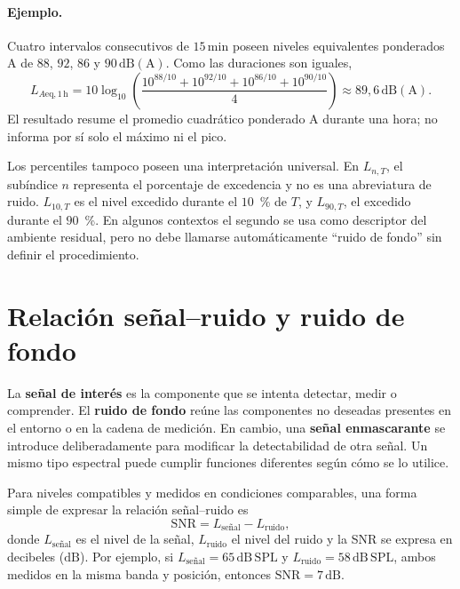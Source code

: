 \paragraph{Ejemplo.}
Cuatro intervalos consecutivos de \(15\,\mathrm{min}\) poseen niveles
equivalentes ponderados A de \(88\), \(92\), \(86\) y \(90\,\mathrm{dB(A)}\).
Como las duraciones son iguales,
\[
L_{A\mathrm{eq},1\,\mathrm{h}}=
10\log_{10}\left(
\frac{10^{88/10}+10^{92/10}+10^{86/10}+10^{90/10}}{4}
\right)
\approx89{,}6\,\mathrm{dB(A)}.
\]
El resultado resume el promedio cuadrático ponderado A durante una hora; no
informa por sí solo el máximo ni el pico.

Los percentiles tampoco poseen una interpretación universal. En
\(L_{n,T}\), el subíndice \(n\) representa el porcentaje de excedencia y no es
una abreviatura de ruido. \(L_{10,T}\) es el nivel excedido durante el
\(10\)~\% de \(T\), y
\(L_{90,T}\), el excedido durante el \(90\)~\%. En algunos contextos el
segundo se usa como descriptor del ambiente residual, pero no debe llamarse
automáticamente ``ruido de fondo'' sin definir el procedimiento.


\section{Relación señal--ruido y ruido de fondo}
\label{sec:u10-snr-fondo}

La \textbf{señal de interés} es la componente que se intenta detectar, medir o
comprender. El \textbf{ruido de fondo} reúne las componentes no deseadas
presentes en el entorno o en la cadena de medición. En cambio, una
\textbf{señal enmascarante} se introduce deliberadamente para modificar la
detectabilidad de otra señal. Un mismo tipo espectral puede cumplir funciones
diferentes según cómo se lo utilice.

Para niveles compatibles y medidos en condiciones comparables, una forma
simple de expresar la relación señal--ruido es
\begin{equation}
    \mathrm{SNR}=L_{\text{señal}}-L_{\text{ruido}},
    \label{eq:u10-snr}
\end{equation}
donde \(L_{\text{señal}}\) es el nivel de la señal,
\(L_{\text{ruido}}\) el nivel del ruido y la SNR se expresa en decibeles
(\(\mathrm{dB}\)). Por ejemplo, si
\(L_{\text{señal}}=65\,\mathrm{dB\,SPL}\) y
\(L_{\text{ruido}}=58\,\mathrm{dB\,SPL}\), ambos medidos en la misma banda y
posición, entonces \(\mathrm{SNR}=7\,\mathrm{dB}\).

